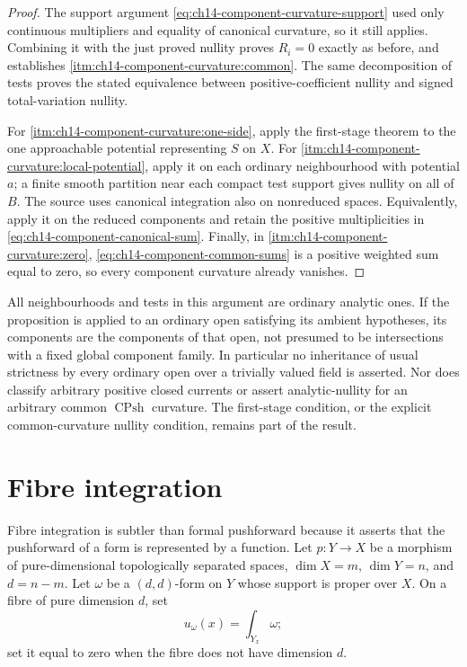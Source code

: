 \begin{proof}
The support argument
\eqref{eq:ch14-component-curvature-support} used only continuous
multipliers and equality of canonical curvature, so it still applies.
Combining it with the just proved nullity proves $R_i=0$ exactly as
before, and establishes
\cref{itm:ch14-component-curvature:common}.
The same decomposition of tests proves the stated equivalence between
positive-coefficient nullity and signed total-variation nullity.

For \cref{itm:ch14-component-curvature:one-side}, apply the first-stage
theorem \cite[Corollary~16.9.4]{CLD25} to the one approachable potential
representing $S$ on $X$.  For
\cref{itm:ch14-component-curvature:local-potential}, apply it on each
ordinary neighbourhood with potential $a$; a finite smooth partition
near each compact test support gives nullity on all of $B$.  The source
uses canonical integration also on nonreduced spaces.  Equivalently,
apply it on the reduced components and retain the positive
multiplicities in \eqref{eq:ch14-component-canonical-sum}.
Finally, in \cref{itm:ch14-component-curvature:zero},
\eqref{eq:ch14-component-common-sums} is a positive weighted sum equal
to zero, so every component curvature already vanishes.
\end{proof}

All neighbourhoods and tests in this argument are ordinary analytic
ones.  If the proposition is applied to an ordinary open satisfying its
ambient hypotheses, its components are the components of that open,
not presumed to be intersections with a fixed global component family.
In particular no inheritance of usual strictness by every ordinary open
over a trivially valued field is asserted.
Nor does  classify arbitrary positive
closed currents or assert analytic-nullity for an arbitrary common
$\operatorname{CPsh}$ curvature.  The first-stage condition, or the
explicit common-curvature nullity condition, remains part of the result.


\section{Fibre integration}
\label{sec:ch14-fibre-integration}

Fibre integration is subtler than formal pushforward because it asserts that
the pushforward of a form is represented by a function.  Let
$p:Y\to X$ be a morphism of pure-dimensional topologically separated spaces,
$\dim X=m$, $\dim Y=n$, and $d=n-m$.  Let $\omega$ be a $(d,d)$-form on $Y$
whose support is proper over $X$.  On a fibre of pure dimension $d$, set
\[
                         u_\omega(x)=\int_{Y_x}\omega;
\]
set it equal to zero when the fibre does not have dimension $d$.

